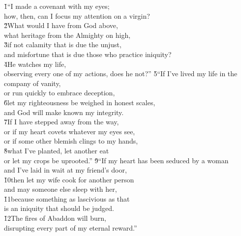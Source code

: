 \begin{poetry}
\poeml {}
\v{1}``I made a covenant with my eyes; \\
\poemll    how, then, can I focus my attention on a virgin? \\
\poeml \v{2}What would I have from God above, \\
\poemll    what heritage from the Almighty on high, \\
\poeml \v{3}if not calamity that is due the unjust, \\
\poemll    and misfortune that is due those who practice iniquity? \\
\poeml \v{4}He watches my life, \\
\poemll    observing every one of my actions, does he not?''
\poeml \v{5}``If I've lived my life in the company of vanity, \\
\poemll    or run quickly to embrace deception, \\
\poeml \v{6}let my righteousness be weighed in honest scales, \\
\poemll    and God will make known my integrity. \\
\poeml \v{7}If I have stepped away from the way, \\
\poemll    or if my heart covets whatever my eyes see, \\
\poemlll       or if some other blemish clings to my hands, \\
\poeml \v{8}what I've planted, let another eat \\
\poemll    or let my crops be uprooted.''
\poeml \v{9}``If my heart has been seduced by a woman \\
\poemll    and I've laid in wait at my friend's door, \\
\poeml \v{10}then let my wife cook for another person \\
\poemll    and may someone else sleep with her, \\
\poeml \v{11}because something as lascivious as that \\
\poemll    is an iniquity that should be judged. \\
\poeml \v{12}The fires of Abaddon will burn, \\
\poemll    disrupting every part of my eternal reward.''

\end{poetry}

